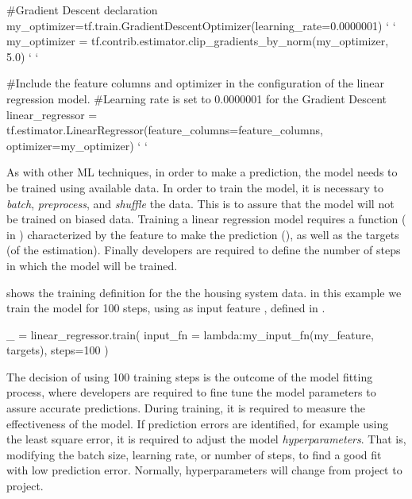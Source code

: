 \begin{tensorflow}[numbers=left,
	label={lst:lrm},
	caption={Generation of the linear regression model}]
 #Gradient Descent declaration
 my_optimizer=tf.train.GradientDescentOptimizer(learning_rate=0.0000001) ` \label{ln:gradient-init} `
 my_optimizer = tf.contrib.estimator.clip_gradients_by_norm(my_optimizer, 5.0) 
 ` \label{ln:gradient-end} `

 #Include the feature columns and optimizer in the configuration of the  linear regression model.
 #Learning rate is set to  0.0000001 for the Gradient Descent
 linear_regressor = tf.estimator.LinearRegressor(feature_columns=feature_columns, optimizer=my_optimizer) ` \label{ln:linear-model} `
\end{tensorflow}

As with other \ac{ML} techniques, in order to make a prediction, the model needs to be trained using 
available data. In order to train the model, it is necessary to \emph{batch}, \emph{preprocess}, and 
\emph{shuffle} the data.  This is to assure that the model will not be trained on biased data. 
Training a linear regression model requires a function ( in 
) characterized by the feature to make the prediction (), as 
well as the targets (of the estimation). Finally developers are required to define the number of steps 
in which the model will be trained.

 shows the training definition for the the housing system data. in this example we 
train the model for 100 steps, using as input feature , defined in 
. 

\begin{tensorflow}[
	label={lst:training},
	caption={Model training}]
 _ = linear_regressor.train(
    input_fn = lambda:my_input_fn(my_feature, targets),
    steps=100
 )
\end{tensorflow}

The decision of using 100 training steps is the outcome of the model fitting process, where developers 
are required to fine tune the model parameters to assure accurate predictions. During training, it is 
required to measure the effectiveness of the model. If prediction errors are identified, for example 
using the least square error, it is required to adjust the model \emph{hyperparameters}. That is, 
modifying the batch size, learning rate, or number of steps, to find a good fit with low prediction error. 
Normally, hyperparameters will change from project to project.

